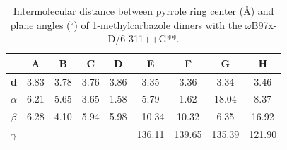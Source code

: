 	\begin{table}[H]
		\caption{Intermolecular distance between pyrrole ring center (Å) and plane angles ($^{\circ}$)  of 1-methylcarbazole dimers with the $\omega$B97x-D/6-311++G**.}
		\begin{center}
			\begin{tabular}{ c c c c c c c c c}
				\hline
				\multicolumn{1}{l}{} & \textbf{A} & \textbf{B} & \textbf{C} & \textbf{D} & \textbf{E} & \textbf{F} & \textbf{G} & \textbf{H} \\ \hline
				\textbf{d
				} & 3.83 & 3.78 & 3.76 & 3.86 & 3.35 & 3.36 & 3.34 & 3.46 \\ 
				\textbf{$\alpha$
				} & 6.21 & 5.65 & 3.65 & 1.58 & 5.79 & 1.62 & 18.04 & 8.37 \\ 
				\textbf{$\beta$
				} & 6.28 & 4.10 & 5.94 & 5.98 & \multicolumn{1}{r}{10.34} & 10.32 & 6.35 & 16.92 \\ 
				\textbf{$\gamma$
				} &  &  &  &  & 136.11 & 139.65 & 135.39 & 121.90 \\ \hline
			\end{tabular}
		\end{center}
		\label{}
	\end{table}


